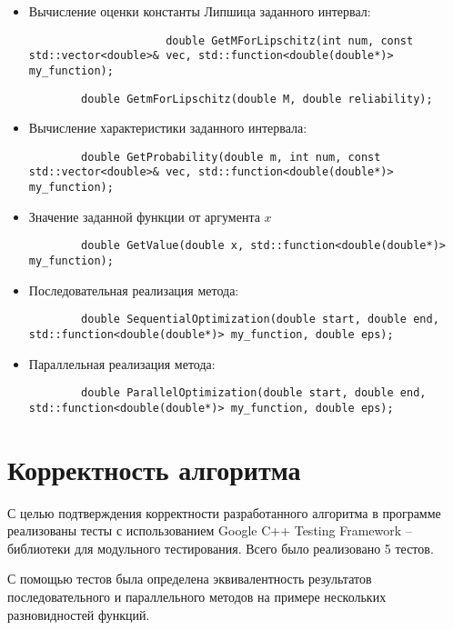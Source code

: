 \documentclass{report}
\begin{document}
\begin{itemize}	 
    \item Вычисление оценки константы Липшица заданного интервал: \par
	\begin{lstlisting}
                     double GetMForLipschitz(int num, const std::vector<double>& vec, std::function<double(double*)> my_function);
	\end{lstlisting}\par
		\begin{lstlisting}
		double GetmForLipschitz(double M, double reliability);
	\end{lstlisting}\par
	\item Вычисление характеристики заданного интервала: \par
	\begin{lstlisting}
		double GetProbability(double m, int num, const std::vector<double>& vec, std::function<double(double*)> my_function);
	\end{lstlisting}\par
	\item Значение заданной функции от аргумента $x$ \par
	\begin{lstlisting}
		double GetValue(double x, std::function<double(double*)> my_function);
	\end{lstlisting}\par
	\item Последовательная реализация метода: \par	
	\begin{lstlisting}
		double SequentialOptimization(double start, double end, std::function<double(double*)> my_function, double eps);
	\end{lstlisting}\par
	\item Параллельная реализация метода: \par	
	\begin{lstlisting}
		double ParallelOptimization(double start, double end, std::function<double(double*)> my_function, double eps);
	\end{lstlisting}\par
\end{itemize}
\newpage

\section*{Корректность алгоритма}
С целью подтверждения корректности разработанного алгоритма в программе реализованы тесты с использованием Google C++ Testing Framework – библиотеки для модульного тестирования. Всего было реализовано 5 тестов. 
\par С помощью тестов была определена эквивалентность результатов последовательного и параллельного методов на примере нескольких разновидностей функций.
\newpage
\end{document}
